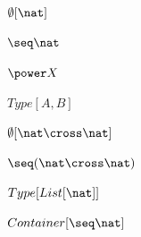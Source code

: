 \documentclass[a4paper,10pt,fleqn]{article}
\begin{document}
\noindent
$\emptyset[\nat]$


\noindent
$\seq \nat$


\noindent
$\power X$


\noindent
$Type[A, B]$


\noindent
$\emptyset[\nat \cross \nat]$


\noindent
$\seq (\nat \cross \nat)$


\noindent
$Type[List[\nat]]$


\noindent
$Container[\seq \nat]$
\end{document}
